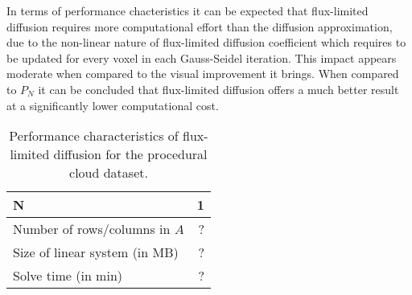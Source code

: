In terms of performance chacteristics it can be expected that flux-limited diffusion requires more computational effort than the diffusion approximation, due to the non-linear nature of flux-limited diffusion coefficient which requires to be updated for every voxel in each Gauss-Seidel iteration. This impact appears moderate when compared to the visual improvement it brings. When compared to $P_N$ it can be concluded that flux-limited diffusion offers a much better result at a significantly lower computational cost.
\begin{table}[!h]
	\centering
	\caption[table test what is this doing here?]{Performance characteristics of flux-limited diffusion for the procedural cloud dataset.}
	\label{tab:results_cloud}
	\begin{tabular}{l r}
    \hline
	\textbf{N}
    & 1
    \\
    \hline
    Number of rows/columns in $A$
    & ?
    \\
    Size of linear system (in MB)
    & ?
    \\
    Solve time (in min)
    & ?
	\end{tabular}
\end{table}

